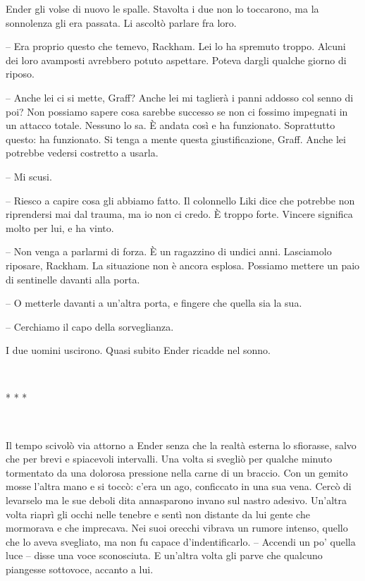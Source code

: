 {Ender gli volse di nuovo le spalle. Stavolta i due non lo toccarono, ma
	la sonnolenza gli era passata. Li ascoltò parlare fra loro.}

{-- Era proprio questo che temevo, Rackham. Lei lo ha spremuto troppo.
	Alcuni dei loro avamposti avrebbero potuto aspettare. Poteva dargli
	qualche giorno di riposo.}

{-- Anche lei ci si mette, Graff? Anche lei mi taglierà i panni addosso
	col senno di poi? Non possiamo sapere cosa sarebbe successo se non ci
	fossimo impegnati in un attacco totale. Nessuno lo sa. È andata così e
	ha funzionato. Soprattutto questo: ha funzionato. Si tenga a mente
	questa giustificazione, Graff. Anche lei potrebbe vedersi costretto a
	usarla.}

{-- Mi scusi.}

{-- Riesco a capire cosa gli abbiamo fatto. Il colonnello Liki dice che
	potrebbe non riprendersi mai dal trauma, ma io non ci credo. È troppo
	forte. Vincere significa molto per lui, e ha vinto.}

{-- Non venga a parlarmi di forza. È un ragazzino di undici anni.
	Lasciamolo riposare, Rackham. La situazione non è ancora esplosa.
	Possiamo mettere un paio di sentinelle davanti alla porta.}

{-- O metterle davanti a un'altra porta, e fingere che quella sia la
	sua.}

{-- Cerchiamo il capo della sorveglianza.}

{I due uomini uscirono. Quasi subito Ender ricadde nel sonno.}

{~}

\begin{center}
	{* * *}
\end{center}

{~}

{Il tempo scivolò via attorno a Ender senza che la realtà esterna lo
	sfiorasse, salvo che per brevi e spiacevoli intervalli. Una volta si
	svegliò per qualche minuto tormentato da una dolorosa pressione nella
	carne di un braccio. Con un gemito mosse l'altra mano e si toccò: c'era
	un ago, conficcato in una sua vena. Cercò di levarselo ma le sue deboli
	dita annasparono invano sul nastro adesivo. Un'altra volta riaprì gli
	occhi nelle tenebre e sentì non distante da lui gente che mormorava e
	che imprecava. Nei suoi orecchi vibrava un rumore intenso, quello che lo
	aveva svegliato, ma non fu capace d'indentificarlo. -- Accendi un po'
	quella luce -- disse una voce sconosciuta. E un'altra volta gli parve
	che qualcuno piangesse sottovoce, accanto a lui.}

